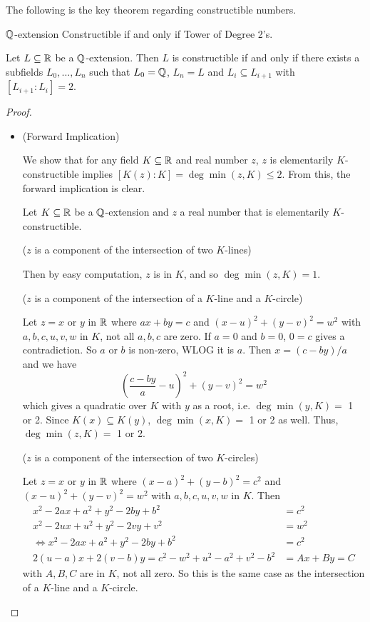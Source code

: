 \documentclass[../book.tex]{subfiles}
\begin{document}
The following is the key theorem regarding constructible numbers. 

\begin{thm} $\mathbb{Q}$-extension Constructible if and only if Tower of Degree 2's.
    
    Let $L \subseteq \mathbb{R}$ be a $\mathbb{Q}$-extension. 
    Then $L$ is constructible if and only if 
    there exists a subfields $L_0, \dots, L_n$ such that 
    $L_0 = \mathbb{Q}$, $L_n = L$ and $L_i \subseteq L_{i+1}$ with $[L_{i+1} : L_i] = 2$.
    
\end{thm}
\begin{proof}
    \begin{itemize}
    \item (Forward Implication)
    
    We show that for any field $K \subseteq \mathbb{R}$ and real number $z$,
    $z$ is elementarily $K$-constructible implies
    $[K(z) : K] = \deg\min(z,K) \leq 2$.
    From this, the forward implication is clear.
    
    Let $K \subseteq \mathbb{R}$ be a $\mathbb{Q}$-extension and 
    $z$ a real number that is elementarily $K$-constructible.
    
    ($z$ is a component of the intersection of two $K$-lines)
    
    Then by easy computation, $z$ is in $K$, and so $\deg\min(z,K) = 1$.
    
    ($z$ is a component of the intersection of a $K$-line and a $K$-circle)
    
    Let $z = x$ or $y$ in $\mathbb{R}$ where $ax + by = c$ and $(x - u)^2 + (y - v)^2 = w^2$
    with $a, b, c, u, v, w$ in $K$, not all $a, b, c$ are zero.
    If $a = 0$ and $b = 0$, $0 = c$ gives a contradiction.
    So $a$ or $b$ is non-zero, WLOG it is $a$.
    Then $x = (c - by) / a$ and we have \[
        (\frac{c - by}{a} - u)^2 + (y - v)^2 = w^2
    \]
    which gives a quadratic over $K$ with $y$ as a root,
    i.e. $\deg\min(y,K) =$ 1 or 2. 
    Since $K(x) \subseteq K(y)$, $\deg\min(x,K) =$ 1 or 2 as well.
    Thus, $\deg\min(z,K) =$ 1 or 2.
    
    ($z$ is a component of the intersection of two $K$-circles)
    
    Let $z = x$ or $y$ in $\mathbb{R}$ where $(x - a)^2 + (y - b)^2 = c^2$ and
    $(x - u)^2 + (y - v)^2 = w^2$ with $a, b, c, u, v, w$ in $K$.
    Then \begin{align*}
        x^2 - 2ax + a^2 + y^2 - 2by + b^2 &= c^2 \\
        x^2 - 2ux + u^2 + y^2 - 2vy + v^2 &= w^2 \\
        \iff 
        x^2 - 2ax + a^2 + y^2 - 2by + b^2 &= c^2 \\
        2(u - a)x + 2(v - b)y = c^2 - w^2 + u^2 - a^2 + v^2 - b^2 &= A x + B y = C
    \end{align*}
    with $A, B, C$ are in $K$, not all zero.
    So this is the same case as the intersection of a $K$-line and a $K$-circle.
    

\end{itemize}
\end{proof}
\end{document}
